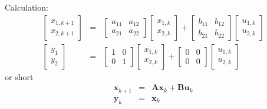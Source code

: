 Calculation:
\begin{eqnarray*}
	\left[ \begin{array}{c} x_{1,k+1} \\ x_{2,k+1} \end{array} \right] &=& \begin{bmatrix} a_{11} & a_{12} \\ a_{21} & a_{22} \end{bmatrix} \left[ \begin{array}{c} x_{1,k} \\ x_{2,k} \end{array} \right] + \begin{bmatrix} b_{11} & b_{12} \\ b_{21} & b_{22} \end{bmatrix} \left[ \begin{array}{c} u_{1,k} \\ u_{2,k} \end{array} \right]\\
\left[ \begin{array}{c} y_{1} \\ y_{2} \end{array} \right] &=& \begin{bmatrix} 1 & 0 \\ 0 & 1 \end{bmatrix} \left[ \begin{array}{c} x_{1,k} \\ x_{2,k} \end{array} \right] + \begin{bmatrix} 0 & 0 \\ 0 & 0 \end{bmatrix} \left[ \begin{array}{c} u_{1,k} \\ u_{2,k} \end{array} \right]
\end{eqnarray*}
or short
\begin{eqnarray*}
	\mathbf{x}_{k+1} &=& \mathbf{A} \mathbf{x}_k + \mathbf{B} \mathbf{u}_k\\
	\mathbf{y}_k &=& \mathbf{x}_k
\end{eqnarray*}